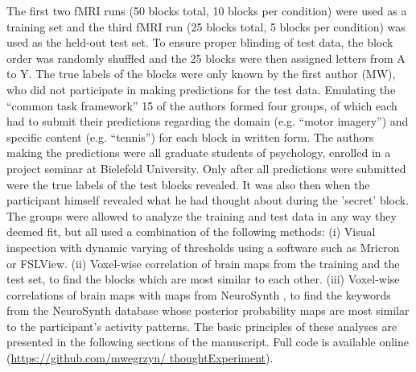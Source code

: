 \documentclass[fleqn,10pt]{SelfArx} %
\begin{document}
The first two fMRI runs (50 blocks total, 10 blocks per condition) were used as a training set and the third fMRI run (25 blocks total, 5 blocks per condition) was used as the held-out test set. To ensure proper blinding of test data, the block order was randomly shuffled and the 25 blocks were then assigned letters from A to Y. The true labels of the blocks were only known by the first author (MW), who did not participate in making predictions for the test data. Emulating the “common task framework” \citep{Liberman_2015} 15 of the authors formed four groups, of which each had to submit their predictions regarding the domain (e.g. “motor imagery”) and specific content (e.g. “tennis”) for each block in written form. The authors making the predictions were all graduate students of psychology, enrolled in a project seminar at Bielefeld University. Only after all predictions were submitted were the true labels of the test blocks revealed. It was also then when the participant himself revealed what he had thought about during the 'secret' block.
The groups were allowed to analyze the training and test data in any way they deemed fit, but all used a combination of the following methods: (i) Visual inspection with dynamic varying of thresholds using a software such as Mricron or FSLView. (ii) Voxel-wise correlation of brain maps from the training and the test set, to find the blocks which are most similar to each other. (iii) Voxel-wise correlations of brain maps with maps from NeuroSynth \citep{Yarkoni_2011}, to find the keywords from the NeuroSynth database whose posterior probability maps are most similar to the participant's activity patterns. The basic principles of these analyses are presented in the following sections of the manuscript. Full code is available online  (\href{https://github.com/mwegrzyn/thoughtExperiment}{https://github.com/mwegrzyn/ thoughtExperiment}).
\end{document}
